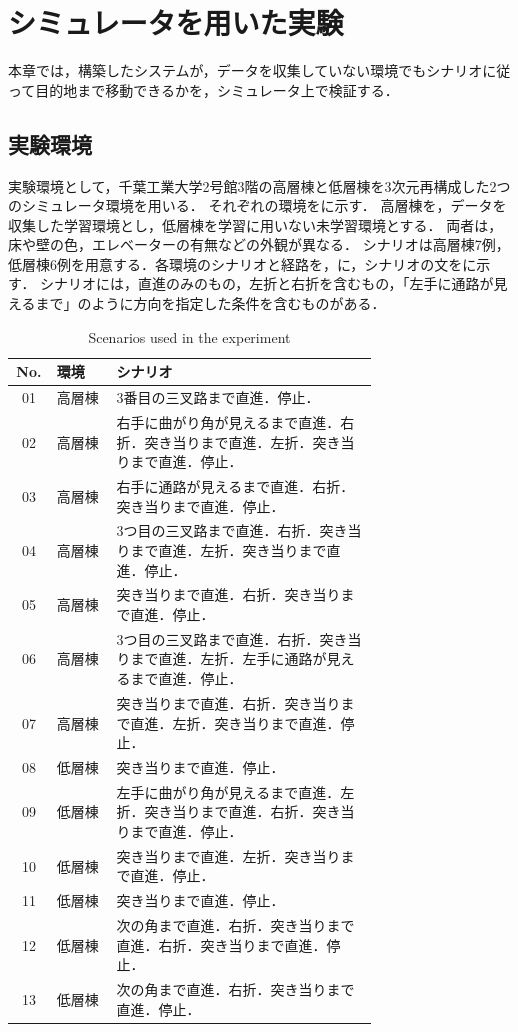 \chapter{シミュレータを用いた実験}
\label{chap:experiment}

本章では，構築したシステムが，データを収集していない環境でもシナリオに従って目的地まで移動できるかを，シミュレータ上で検証する．

\section{実験環境}
\label{sec:experiment_env}

実験環境として，千葉工業大学2号館3階の高層棟と低層棟を3次元再構成した2つのシミュレータ環境を用いる．
それぞれの環境をに示す．
高層棟を，データを収集した学習環境とし，低層棟を学習に用いない未学習環境とする．
両者は，床や壁の色，エレベーターの有無などの外観が異なる．
シナリオは高層棟7例，低層棟6例を用意する．各環境のシナリオと経路を，に，シナリオの文をに示す．
シナリオには，直進のみのもの，左折と右折を含むもの，「左手に通路が見えるまで」のように方向を指定した条件を含むものがある．

\begin{table}[tb]
  \centering
  \caption{Scenarios used in the experiment}
  \label{tab:scenarios}
  \small
  \begin{tabular}{clp{0.72\linewidth}}
    \toprule
    No. & 環境 & シナリオ \\
    \midrule
    01 & 高層棟 & 3番目の三叉路まで直進．停止． \\
    02 & 高層棟 & 右手に曲がり角が見えるまで直進．右折．突き当りまで直進．左折．突き当りまで直進．停止． \\
    03 & 高層棟 & 右手に通路が見えるまで直進．右折．突き当りまで直進．停止． \\
    04 & 高層棟 & 3つ目の三叉路まで直進．右折．突き当りまで直進．左折．突き当りまで直進．停止． \\
    05 & 高層棟 & 突き当りまで直進．右折．突き当りまで直進．停止． \\
    06 & 高層棟 & 3つ目の三叉路まで直進．右折．突き当りまで直進．左折．左手に通路が見えるまで直進．停止． \\
    07 & 高層棟 & 突き当りまで直進．右折．突き当りまで直進．左折．突き当りまで直進．停止． \\
    08 & 低層棟 & 突き当りまで直進．停止． \\
    09 & 低層棟 & 左手に曲がり角が見えるまで直進．左折．突き当りまで直進．右折．突き当りまで直進．停止． \\
    10 & 低層棟 & 突き当りまで直進．左折．突き当りまで直進．停止． \\
    11 & 低層棟 & 突き当りまで直進．停止． \\
    12 & 低層棟 & 次の角まで直進．右折．突き当りまで直進．右折．突き当りまで直進．停止． \\
    13 & 低層棟 & 次の角まで直進．右折．突き当りまで直進．停止． \\
    \bottomrule
  \end{tabular}
\end{table}

